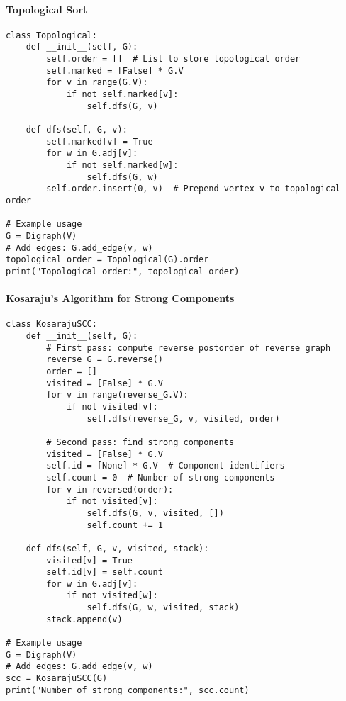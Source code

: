\documentclass{article}
\begin{document}
\paragraph{Topological Sort}

\begin{verbatim}
class Topological:
    def __init__(self, G):
        self.order = []  # List to store topological order
        self.marked = [False] * G.V
        for v in range(G.V):
            if not self.marked[v]:
                self.dfs(G, v)

    def dfs(self, G, v):
        self.marked[v] = True
        for w in G.adj[v]:
            if not self.marked[w]:
                self.dfs(G, w)
        self.order.insert(0, v)  # Prepend vertex v to topological order

# Example usage
G = Digraph(V)
# Add edges: G.add_edge(v, w)
topological_order = Topological(G).order
print("Topological order:", topological_order)
\end{verbatim}

\paragraph{Kosaraju's Algorithm for Strong Components}

\begin{verbatim}
class KosarajuSCC:
    def __init__(self, G):
        # First pass: compute reverse postorder of reverse graph
        reverse_G = G.reverse()
        order = []
        visited = [False] * G.V
        for v in range(reverse_G.V):
            if not visited[v]:
                self.dfs(reverse_G, v, visited, order)
        
        # Second pass: find strong components
        visited = [False] * G.V
        self.id = [None] * G.V  # Component identifiers
        self.count = 0  # Number of strong components
        for v in reversed(order):
            if not visited[v]:
                self.dfs(G, v, visited, [])
                self.count += 1

    def dfs(self, G, v, visited, stack):
        visited[v] = True
        self.id[v] = self.count
        for w in G.adj[v]:
            if not visited[w]:
                self.dfs(G, w, visited, stack)
        stack.append(v)

# Example usage
G = Digraph(V)
# Add edges: G.add_edge(v, w)
scc = KosarajuSCC(G)
print("Number of strong components:", scc.count)
\end{verbatim}
\end{document}
